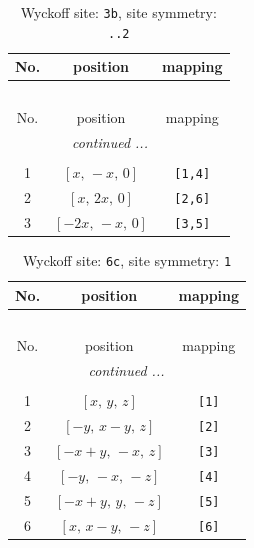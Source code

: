 \documentclass[fleqn,8pt]{jsarticle}
\begin{document}
\begin{longtable}{ccc}
\caption{Wyckoff site: {\tt 3b}, site symmetry: {\tt ..2}}
 \\
 \hline \hline
No. & position & mapping \\ \hline \endfirsthead

\multicolumn{2}{l}{\tablename\ \thetable{}} \\
 \hline \hline
No. & position & mapping \\ \hline \endhead

 \hline \hline
\multicolumn{2}{r}{\footnotesize\it continued ...} \\ \endfoot

 \hline \hline
\multicolumn{2}{r}{} \\ \endlastfoot

1 & $\left[ x,\, - x,\, 0 \right]$ & {\tt [1,4]} \\ \hline
2 & $\left[ x,\, 2 x,\, 0 \right]$ & {\tt [2,6]} \\ \hline
3 & $\left[ - 2 x,\, - x,\, 0 \right]$ & {\tt [3,5]} \\
\end{longtable}
\renewcommand{\arraystretch}{1.2}
\begin{longtable}{ccc}
\caption{Wyckoff site: {\tt 6c}, site symmetry: {\tt 1}}
 \\
 \hline \hline
No. & position & mapping \\ \hline \endfirsthead

\multicolumn{2}{l}{\tablename\ \thetable{}} \\
 \hline \hline
No. & position & mapping \\ \hline \endhead

 \hline \hline
\multicolumn{2}{r}{\footnotesize\it continued ...} \\ \endfoot

 \hline \hline
\multicolumn{2}{r}{} \\ \endlastfoot

1 & $\left[ x,\, y,\, z \right]$ & {\tt [1]} \\ \hline
2 & $\left[ - y,\, x - y,\, z \right]$ & {\tt [2]} \\ \hline
3 & $\left[ - x + y,\, - x,\, z \right]$ & {\tt [3]} \\ \hline
4 & $\left[ - y,\, - x,\, - z \right]$ & {\tt [4]} \\ \hline
5 & $\left[ - x + y,\, y,\, - z \right]$ & {\tt [5]} \\ \hline
6 & $\left[ x,\, x - y,\, - z \right]$ & {\tt [6]} \\
\end{longtable}
\end{document}
